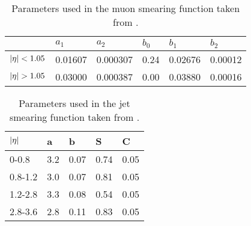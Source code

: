 \begin{table}[H]
\renewcommand{\arraystretch}{1.5} %
\begin{center}
\begin{tabular}{|l|l|l|l|l|l|}
\hline
 &$a_1$&$a_2$&$b_0$&$b_1$&$b_2$ \\ \hline
$|\eta|<1.05$&0.01607&0.000307&0.24&0.02676&0.00012 \\ \hline
$\abs{\eta}>1.05$&0.03000&0.000387&0.00&0.03880&0.00016 \\ \hline
\end{tabular}
\end{center}
\caption{Parameters used in the muon smearing function taken from \citep{ATL-PHYS-PUB-2013-004}.}
\label{tab:muonparam}
\renewcommand{\arraystretch}{1.0} %
\end{table}
\begin{table}[H]
\renewcommand{\arraystretch}{1.5} %
\begin{center}
\begin{tabular}{|l|l|l|l|l|}
\hline
$|\eta|$&a&b&S&C \\ \hline
0-0.8&3.2&0.07&0.74&0.05 \\
0.8-1.2&3.0&0.07&0.81&0.05 \\
1.2-2.8&3.3&0.08&0.54&0.05 \\
2.8-3.6&2.8&0.11&0.83&0.05 \\ \hline
\end{tabular}
\end{center}
\caption{Parameters used in the jet smearing function taken from \citep{ATL-PHYS-PUB-2013-004}.}
\label{tab:jetparam}
\renewcommand{\arraystretch}{1.0} %
\end{table}

